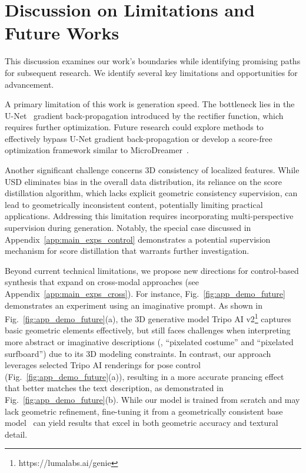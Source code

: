 
\section{Discussion on Limitations and Future Works}\label{app:ext_pose}


This discussion examines our work's boundaries while identifying promising paths for subsequent research. We identify several key limitations and opportunities for advancement.

A primary limitation of this work is generation speed. The bottleneck lies in the U-Net~\citep{ronneberger2015u} gradient back-propagation introduced by the rectifier function, which requires further optimization. Future research could explore methods to effectively bypass U-Net gradient back-propagation or develop a score-free optimization framework similar to MicroDreamer~\citep{chen2024microdreamer}.


Another significant challenge concerns 3D consistency of localized features. While USD eliminates bias in the overall data distribution, its reliance on the score distillation algorithm, which lacks explicit geometric consistency supervision, can lead to geometrically inconsistent content, potentially limiting practical applications. Addressing this limitation requires incorporating multi-perspective supervision during generation. Notably, the special case discussed in Appendix~\ref{app:main_exps_control} demonstrates a potential supervision mechanism for score distillation that warrants further investigation.


Beyond current technical limitations, we propose new directions for control-based synthesis that expand on cross-modal approaches (see Appendix~\ref{app:main_exps_cross}). For instance, Fig.~\ref{fig:app_demo_future} demonstrates an experiment using an imaginative prompt. As shown in Fig.~\ref{fig:app_demo_future}(a), the 3D generative model Tripo AI v2\footnote{https://lumalabs.ai/genie} captures basic geometric elements effectively, but still faces challenges when interpreting more abstract or imaginative descriptions (\ie, ``pixelated costume'' and ``pixelated surfboard'') due to its 3D modeling constraints. In contrast, our approach leverages selected Tripo AI renderings for pose control (Fig.~\ref{fig:app_demo_future}(a)), resulting in a more accurate prancing effect that better matches the text description, as demonstrated in Fig.~\ref{fig:app_demo_future}(b). While our model is trained from scratch and may lack geometric refinement, fine-tuning it from a geometrically consistent base model~\citep{zheng2024learning} can yield results that excel in both geometric accuracy and textural detail.


